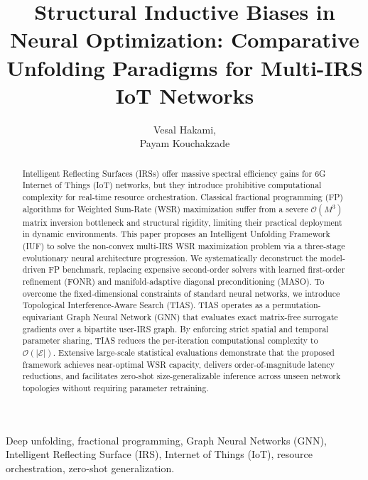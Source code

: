 \documentclass[journal]{IEEEtran}
\begin{document}
\title{Structural Inductive Biases in Neural Optimization: Comparative Unfolding Paradigms for Multi-IRS IoT Networks}

\author{Vesal Hakami, \\
Payam Kouchakzade}

\maketitle

\begin{abstract}
Intelligent Reflecting Surfaces (IRSs) offer massive spectral efficiency gains for 6G Internet of Things (IoT) networks, but they introduce prohibitive computational complexity for real-time resource orchestration. Classical fractional programming (FP) algorithms for Weighted Sum-Rate (WSR) maximization suffer from a severe $\mathcal{O}(M^3)$ matrix inversion bottleneck and structural rigidity, limiting their practical deployment in dynamic environments. This paper proposes an Intelligent Unfolding Framework (IUF) to solve the non-convex multi-IRS WSR maximization problem via a three-stage evolutionary neural architecture progression. We systematically deconstruct the model-driven FP benchmark, replacing expensive second-order solvers with learned first-order refinement (FONR) and manifold-adaptive diagonal preconditioning (MASO). To overcome the fixed-dimensional constraints of standard neural networks, we introduce Topological Interference-Aware Search (TIAS). TIAS operates as a permutation-equivariant Graph Neural Network (GNN) that evaluates exact matrix-free surrogate gradients over a bipartite user-IRS graph. By enforcing strict spatial and temporal parameter sharing, TIAS reduces the per-iteration computational complexity to $\mathcal{O}(|\mathcal{E}|)$. Extensive large-scale statistical evaluations demonstrate that the proposed framework achieves near-optimal WSR capacity, delivers order-of-magnitude latency reductions, and facilitates zero-shot size-generalizable inference across unseen network topologies without requiring parameter retraining.
\end{abstract}

\begin{IEEEkeywords}
Deep unfolding, fractional programming, Graph Neural Networks (GNN), Intelligent Reflecting Surface (IRS), Internet of Things (IoT), resource orchestration, zero-shot generalization.
\end{IEEEkeywords}
\end{document}
